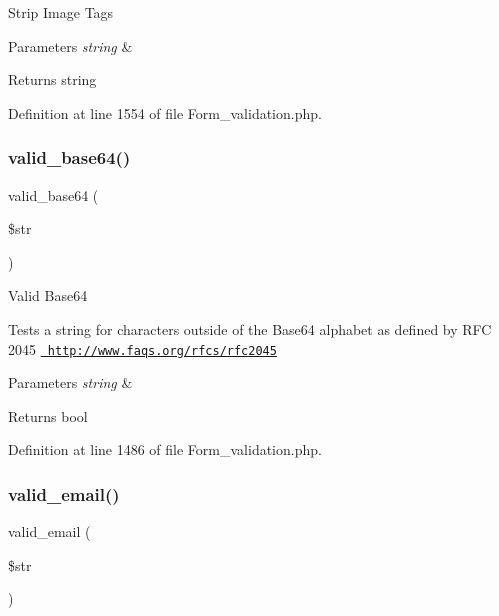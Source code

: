 Strip Image Tags


\begin{DoxyParams}{Parameters}
{\em string} & \\
\hline
\end{DoxyParams}
\begin{DoxyReturn}{Returns}
string 
\end{DoxyReturn}


Definition at line 1554 of file Form\+\_\+validation.\+php.

\mbox{\label{class_c_i___form__validation_a9bec2f0a508e0327d4b048ecfc204522}} 
\subsubsection{\texorpdfstring{valid\_base64()}{valid\_base64()}}
{\footnotesize\ttfamily valid\+\_\+base64 (\begin{DoxyParamCaption}\item[{}]{\$str }\end{DoxyParamCaption})}

Valid Base64

Tests a string for characters outside of the Base64 alphabet as defined by R\+FC 2045 \href{http://www.faqs.org/rfcs/rfc2045}{\texttt{ http\+://www.\+faqs.\+org/rfcs/rfc2045}}


\begin{DoxyParams}{Parameters}
{\em string} & \\
\hline
\end{DoxyParams}
\begin{DoxyReturn}{Returns}
bool 
\end{DoxyReturn}


Definition at line 1486 of file Form\+\_\+validation.\+php.

\mbox{\label{class_c_i___form__validation_af7d43edae9c6e388390176b3c62de140}} 
\subsubsection{\texorpdfstring{valid\_email()}{valid\_email()}}
{\footnotesize\ttfamily valid\+\_\+email (\begin{DoxyParamCaption}\item[{}]{\$str }\end{DoxyParamCaption})}

